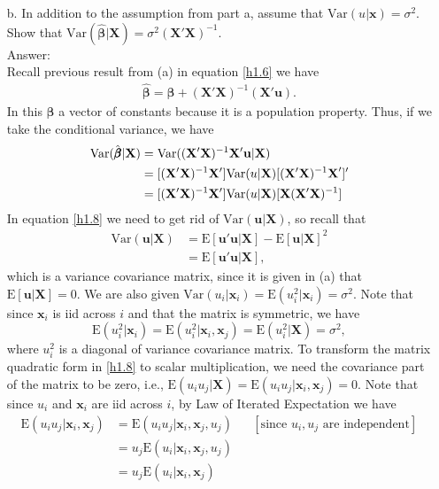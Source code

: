 \documentclass[10pt]{article}
\newcommand{\E}{\text{E}}
\newcommand{\V}{\text{Var}}
\begin{document}
\begin{enumerate}
\item[b.] In addition to the assumption from part a, assume that $\V(u|\mathbf{x})=\sigma^2.$ Show that $\V({\hat{\pmb{\beta}}}|\mathbf{X})=\sigma^2(\mathbf{X}'\mathbf{X})^{-1}.$
\\ Answer:\\
Recall previous result from (a) in equation \eqref{h1.6} we have
\begin{align*}
    \hat{\pmb{\beta}}=\pmb{\beta}+(\mathbf{X'X})^{-1}(\mathbf{X'u}).
\end{align*}
In this $\pmb{\beta}$ a vector of constants because it is a population property. Thus, if we take the conditional variance, we have
\begin{align}
    \V(\hat{\pmb{\beta}}|\textbf{X})&=\V((\mathbf{X'X})^{-1}\mathbf{X'u}|\textbf{X}) \notag \\
    &=[(\mathbf{X'X})^{-1}\mathbf{X'}]\V({u}|\textbf{X})[(\mathbf{X'X})^{-1}\textbf{X}']' \notag \\
    &=[(\mathbf{X'X})^{-1}\mathbf{X'}]\V({u}|\textbf{X})[\textbf{X}(\mathbf{X'X})^{-1}] \label{h1.8}
\end{align}
In equation \eqref{h1.8} we need to get rid of $\V({\textbf{u}}|\textbf{X})$, so recall that
\begin{align*}
\V({\textbf{u}}|\textbf{X})&=\E[\mathbf{u'u}|\textbf{X}]-\E[\mathbf{u}|\textbf{X}]^2 \\
&=\E[\mathbf{u'u}|\textbf{X}],
\end{align*}
which is a variance covariance matrix, since it is given in (a) that $\E[\mathbf{u}|\textbf{X}]=0.$ We are also given $\V(u_i|\mathbf{x}_i)=\E(u_i^2|\mathbf{x}_i)=\sigma^2$. Note that since $\textbf{x}_i$ is iid across $i$ and that the matrix is symmetric, we have \[\E(u_i^2|\mathbf{x}_i)=\E(u_i^2|\mathbf{x}_i,\mathbf{x}_j)=\E(u_i^2|\mathbf{X})=\sigma^2,\] 
where $u_i^2$ is a diagonal of variance covariance matrix. To transform the matrix quadratic form in \eqref{h1.8} to scalar multiplication, we need the covariance part of the matrix to be zero, i.e., $\E(u_iu_j|\mathbf{X})=\E(u_iu_j|\mathbf{x}_i,\mathbf{x}_j)=0$.  Note that since $u_i$ and $\textbf{x}_i$ are iid across $i$, by Law of Iterated Expectation we have 
\begin{align*}
    \E(u_iu_j|\mathbf{x}_i,\mathbf{x}_j)&=\E(u_iu_j|\mathbf{x}_i,\mathbf{x}_j,u_j)& &[\text{since } u_i,u_j \text{ are independent}]\\
    &=u_j\E(u_i|\mathbf{x}_i,\mathbf{x}_j,u_j)&\\
    &=u_j\E(u_i|\mathbf{x}_i,\mathbf{x}_j)&\\

\end{align*}
\end{enumerate}
\end{document}
